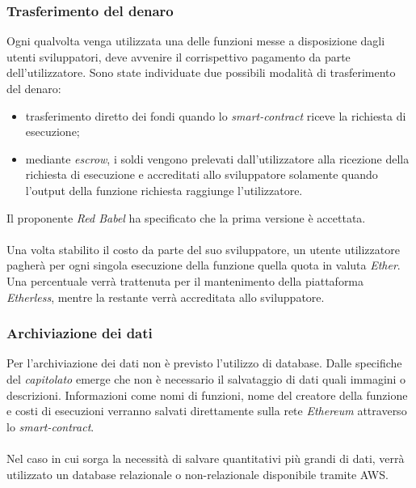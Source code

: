 \subsubsection{Trasferimento del denaro}
Ogni qualvolta venga utilizzata una delle funzioni messe a disposizione dagli utenti sviluppatori, deve avvenire il corrispettivo pagamento da parte dell'utilizzatore. Sono state individuate due possibili modalità di trasferimento del denaro:
\begin{itemize}
	\item trasferimento diretto dei fondi quando lo \textit{smart-contract\glo} riceve la richiesta di esecuzione;
	\item mediante \textit{escrow\glos}, i soldi vengono prelevati dall'utilizzatore alla ricezione della richiesta di esecuzione e accreditati allo sviluppatore solamente quando l'output della funzione richiesta raggiunge l'utilizzatore.
\end{itemize}
Il proponente \textit{Red Babel} ha specificato che la prima versione è accettata.\\\\
Una volta stabilito il costo da parte del suo sviluppatore, un utente utilizzatore pagherà per ogni singola esecuzione della funzione quella quota in valuta \textit{Ether\glos}. Una percentuale verrà trattenuta per il mantenimento della piattaforma \textit{Etherless}, mentre la restante verrà accreditata allo sviluppatore.

\subsubsection{Archiviazione dei dati}
Per l'archiviazione dei dati non è previsto l'utilizzo di database. Dalle specifiche del \textit{capitolato\glo} emerge che non è necessario il salvataggio di dati quali immagini o descrizioni. Informazioni come nomi di funzioni, nome del creatore della funzione e costi di esecuzioni verranno salvati direttamente sulla rete \textit{Ethereum\glo} attraverso lo  \textit{smart-contract\glos}.
\\\\
Nel caso in cui sorga la necessità di salvare quantitativi più grandi di dati, verrà utilizzato un database relazionale o non-relazionale disponibile tramite AWS.

